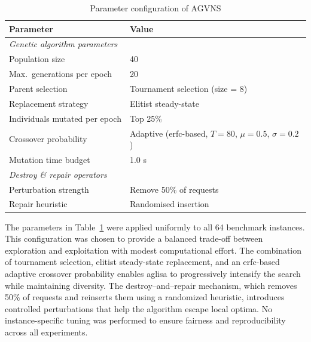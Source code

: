\documentclass[]{interact}
\begin{document}
\begin{table}[htbp]
\centering
\caption{Parameter configuration of AGVNS}
\label{tab:parameters}
\begin{tabular}{l l}
\toprule
\textbf{Parameter} & \textbf{Value} \\
\midrule
\multicolumn{2}{l}{\textit{Genetic algorithm parameters}} \\
Population size & 40 \\
Max.\ generations per epoch & 20 \\
Parent selection & Tournament selection (size = 8) \\
Replacement strategy & Elitist steady-state \\
Individuals mutated per epoch & Top 25\% \\
Crossover probability & Adaptive (erfc-based, $T{=}80$, $\mu{=}0.5$, $\sigma{=}0.2$) \\
Mutation time budget & 1.0 s \\
\midrule
\multicolumn{2}{l}{\textit{Destroy \& repair operators}} \\
Perturbation strength & Remove 50\% of requests \\
Repair heuristic & Randomised insertion \\
\bottomrule
\end{tabular}
\end{table}

The parameters in Table~\ref{tab:parameters} were applied uniformly to all 64 benchmark instances. This configuration was chosen to provide a balanced trade-off between exploration and exploitation with modest computational effort. The combination of tournament selection, elitist steady-state replacement, and an erfc-based adaptive crossover probability enables \gls{aglisa} to progressively intensify the search while maintaining diversity. The destroy–and–repair mechanism, which removes 50\% of requests and reinserts them using a randomized heuristic, introduces controlled perturbations that help the algorithm escape local optima. No instance-specific tuning was performed to ensure fairness and reproducibility across all experiments.



\end{document}
